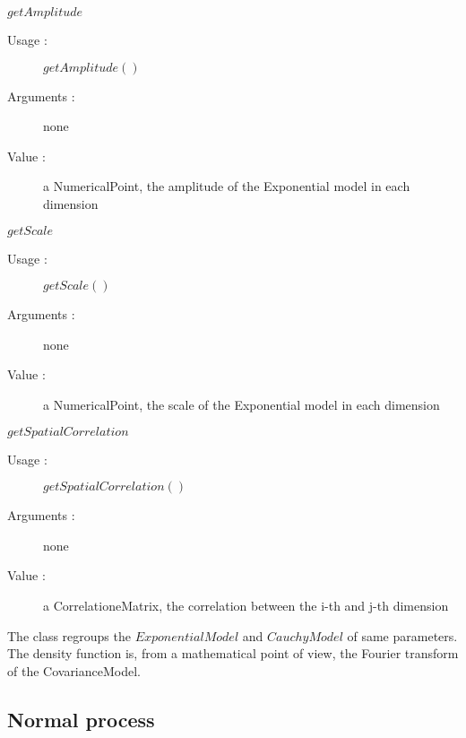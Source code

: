 \begin{description}
  \begin{description}

     \item $getAmplitude$
    \begin{description}
    \item[Usage :] $getAmplitude()$
    \item[Arguments :] none
    \item[Value :]   a NumericalPoint, the amplitude of the Exponential model in each dimension
    \end{description}
    \bigskip

    \item $getScale$
    \begin{description}
    \item[Usage :] $getScale()$
    \item[Arguments :] none
    \item[Value :]   a NumericalPoint, the scale of the Exponential model in each dimension
    \end{description}
    \bigskip

     \item $getSpatialCorrelation$
    \begin{description}
    \item[Usage :] $getSpatialCorrelation()$
    \item[Arguments :] none
    \item[Value :]   a CorrelationeMatrix, the correlation between the i-th and j-th dimension
    \end{description}
    \bigskip

  \end{description}

\item[Remark :]  \rule{0pt}{1em}

The class regroups the $ExponentialModel$ and $CauchyModel$ of same parameters.\\
The density function is, from a mathematical point of view, the Fourier transform of the CovarianceModel.

\end{description}


\newpage \subsection{Normal process}

